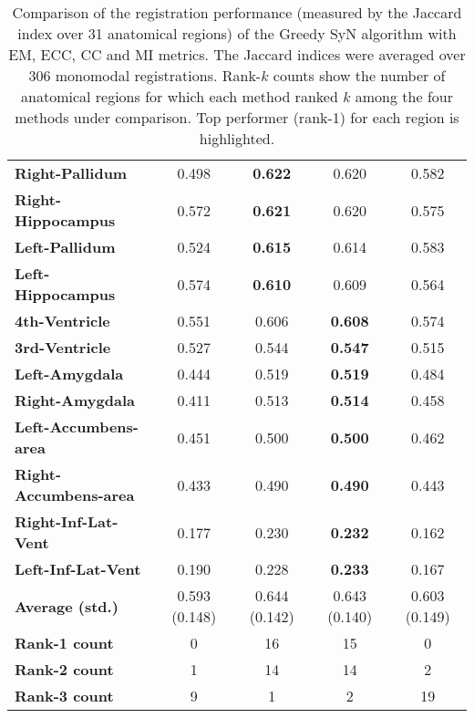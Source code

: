 \begin{table}[p]
\begin{adjustwidth}{-0.75cm}{}
{\begin{tabular}{lcccc}
    \textbf{Right-Pallidum} & 0.498 & \textbf{0.622} & 0.620 & 0.582 \\
    \textbf{Right-Hippocampus} & 0.572 & \textbf{0.621} & 0.620 & 0.575 \\
    \textbf{Left-Pallidum} & 0.524 & \textbf{0.615} & 0.614 & 0.583 \\
    \textbf{Left-Hippocampus} & 0.574 & \textbf{0.610} & 0.609 & 0.564 \\
    \textbf{4th-Ventricle} & 0.551 & 0.606 & \textbf{0.608} & 0.574 \\
    \textbf{3rd-Ventricle} & 0.527 & 0.544 & \textbf{0.547} & 0.515 \\
    \textbf{Left-Amygdala} & 0.444 & 0.519 & \textbf{0.519} & 0.484 \\
    \textbf{Right-Amygdala} & 0.411 & 0.513 & \textbf{0.514} & 0.458 \\
    \textbf{Left-Accumbens-area} & 0.451 & 0.500 & \textbf{0.500} & 0.462 \\
    \textbf{Right-Accumbens-area} & 0.433 & 0.490 & \textbf{0.490} & 0.443 \\
    \textbf{Right-Inf-Lat-Vent} & 0.177 & 0.230 & \textbf{0.232} & 0.162 \\
    \textbf{Left-Inf-Lat-Vent} & 0.190 & 0.228 & \textbf{0.233} & 0.167 \\
    \hline
    \textbf{Average (std.)} & 0.593 (0.148) & 0.644 (0.142) & 0.643 (0.140) & 0.603 (0.149) \\
    \textbf{Rank-1 count} & 0 & 16 & 15 & 0 \\
    \textbf{Rank-2 count} & 1 & 14 & 14 & 2 \\
    \textbf{Rank-3 count} & 9 & 1 & 2 & 19 \\
    \bottomrule
    \end{tabular}}%
    \caption{Comparison of the registration performance (measured by the Jaccard index over 31 anatomical regions) of the Greedy SyN algorithm with EM, ECC, CC and MI metrics.
The Jaccard indices were averaged over 306 monomodal registrations. Rank-$k$ counts show the number of anatomical regions for which each
method ranked $k$ among the four methods under comparison. Top performer (rank-1) for each region is highlighted. }
  \label{tab:monomodal_results_seg}%
\end{adjustwidth}
\end{table}%
